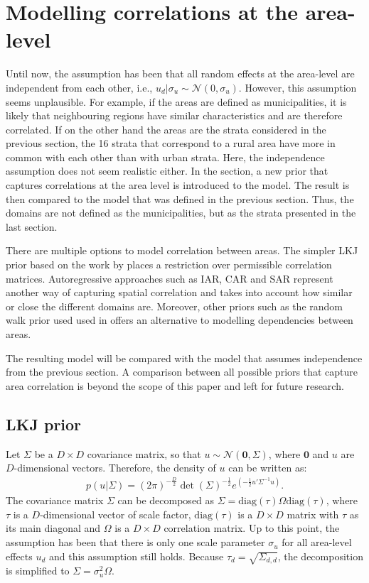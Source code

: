\section{Modelling correlations at the area-level}
\label{ch:area_corr}

Until now, the assumption has been that all random effects at the area-level are independent from each other, i.e., $u_d|\sigma_u \sim \mathcal N (0, \sigma_u)$.
However, this assumption seems unplausible.
For example, if the areas are defined as municipalities, it is likely that neighbouring regions have similar characteristics and are therefore correlated.
If on the other hand the areas are the strata considered in the previous section, the 16 strata that correspond to a rural area have more in common with each other than with urban strata.
Here, the independence assumption does not seem realistic either.
In the section, a new prior that captures correlations at the area level is introduced to the model.
The result is then compared to the model that was defined in the previous section.
Thus, the domains are not defined as the municipalities, but as the strata presented in the last section.

There are multiple options to model correlation between areas.
The simpler LKJ prior based on the work by \cite{lewandowski_generating_2009} places a restriction over permissible correlation matrices.
Autoregressive approaches such as IAR, CAR and SAR \citep{chung_bayesian_2020} represent another way of capturing spatial correlation and takes into account how similar or close the different domains are.
Moreover, other priors such as the random walk prior used used in \cite{gao_improving_2021} offers an alternative to modelling dependencies between areas.

The resulting model will be compared with the model that assumes independence from the previous section.
A comparison between all possible priors that capture area correlation is beyond the scope of this paper and left for future research.

\subsection{LKJ prior}

Let $\Sigma$ be a $D \times D$ covariance matrix, so that $u \sim \mathcal{N}(\boldsymbol{0}, \Sigma)$, where $\boldsymbol 0$ and $u$ are $D$-dimensional vectors.
Therefore, the density of $u$ can be written as:
\begin{gather*}
    p(u|\Sigma) = (2\pi)^{-\frac D 2}\det(\Sigma)^{-\frac 1 2} e^{(-\frac 1 2 u'\Sigma^{-1} u)}.
\end{gather*}
The covariance matrix $\Sigma$ can be decomposed as $\Sigma = \text{diag}(\tau)\Omega\text{diag}(\tau)$, where $\tau$ is a $D$-dimensional vector of scale factor, $\text{diag}(\tau)$ is a $D \times D$ matrix with $\tau$ as its main diagonal and $\Omega$ is a $D \times D$ correlation matrix.
Up to this point, the assumption has been that there is only one scale parameter $\sigma_u$ for all area-level effects $u_d$ and this assumption still holds.
Because $\tau_d = \sqrt{\Sigma_{d, d}}$, the decomposition is simplified to $\Sigma = \sigma_u^2 \Omega$.

